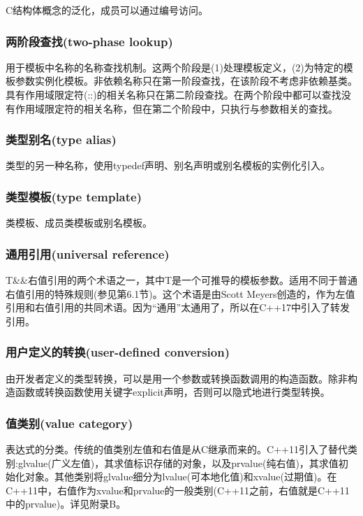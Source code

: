 C结构体概念的泛化，成员可以通过编号访问。

\subsubsection{两阶段查找(two-phase lookup)}

用于模板中名称的名称查找机制。这两个阶段是(1)处理模板定义，(2)为特定的模板参数实例化模板。非依赖名称只在第一阶段查找，在该阶段不考虑非依赖基类。具有作用域限定符(::)的相关名称只在第二阶段查找。在两个阶段中都可以查找没有作用域限定符的相关名称，但在第二个阶段中，只执行与参数相关的查找。

\subsubsection{类型别名(type alias)}

类型的另一种名称，使用typedef声明、别名声明或别名模板的实例化引入。

\subsubsection{类型模板(type template)}

类模板、成员类模板或别名模板。

\subsubsection{通用引用(universal reference)}

T\&\&右值引用的两个术语之一，其中T是一个可推导的模板参数。适用不同于普通右值引用的特殊规则(参见第6.1节)。这个术语是由Scott Meyers创造的，作为左值引用和右值引用的共同术语。因为“通用”太通用了，所以在C++17中引入了转发引用。

\subsubsection{用户定义的转换(user-defined conversion)}

由开发者定义的类型转换，可以是用一个参数或转换函数调用的构造函数。除非构造函数或转换函数使用关键字explicit声明，否则可以隐式地进行类型转换。

\subsubsection{值类别(value category)}

表达式的分类。传统的值类别左值和右值是从C继承而来的。C++11引入了替代类别:glvalue(广义左值)，其求值标识存储的对象，以及prvalue(纯右值)，其求值初始化对象。其他类别将glvalue细分为lvalue(可本地化值)和xvalue(过期值)。在C++11中，右值作为xvalue和prvalue的一般类别(C++11之前，右值就是C++11中的prvalue)。详见附录B。

